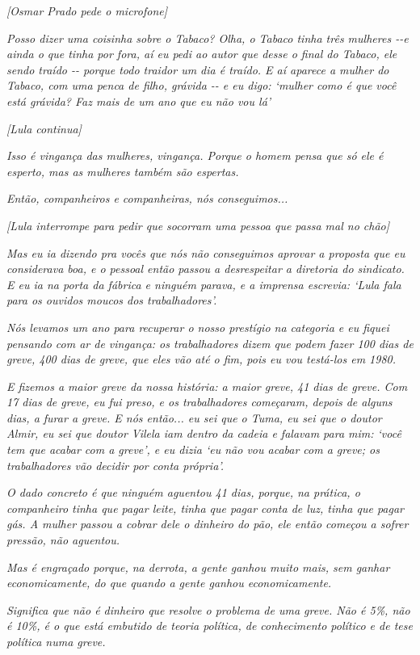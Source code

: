 \emph{{[}Osmar Prado pede o microfone{]}}

\emph{Posso dizer uma coisinha sobre o Tabaco? Olha, o Tabaco tinha três
mulheres -\/-e ainda o que tinha por fora, aí eu pedi ao autor que desse
o final do Tabaco, ele sendo traído -\/- porque todo traidor um dia é
traído. E aí aparece a mulher do Tabaco, com uma penca de filho, grávida
-\/- e eu digo: `mulher como é que você está grávida? Faz mais de um ano
que eu não vou lá'}

\emph{{[}Lula continua{]}}

\emph{Isso é vingança das mulheres, vingança. Porque o homem pensa que
só ele é esperto, mas as mulheres também são espertas.}

\emph{Então, companheiros e companheiras, nós conseguimos...}

\emph{{[}Lula interrompe para pedir que socorram uma pessoa que passa
mal no chão{]}}

\emph{Mas eu ia dizendo pra vocês que nós não conseguimos aprovar a
proposta que eu considerava boa, e o pessoal então passou a desrespeitar
a diretoria do sindicato. E eu ia na porta da fábrica e ninguém parava,
e a imprensa escrevia: `Lula fala para os ouvidos moucos dos
trabalhadores'.}

\emph{Nós levamos um ano para recuperar o nosso prestígio na categoria e
eu fiquei pensando com ar de vingança: os trabalhadores dizem que podem
fazer 100 dias de greve, 400 dias de greve, que eles vão até o fim, pois
eu vou testá-los em 1980.}

\emph{E fizemos a maior greve da nossa história: a maior greve, 41 dias
de greve. Com 17 dias de greve, eu fui preso, e os trabalhadores
começaram, depois de alguns dias, a furar a greve. E nós então... eu sei
que o Tuma, eu sei que o doutor Almir, eu sei que doutor Vilela iam
dentro da cadeia e falavam para mim: `você tem que acabar com a greve',
e eu dizia `eu não vou acabar com a greve; os trabalhadores vão decidir
por conta própria'.}

\emph{O dado concreto é que ninguém aguentou 41 dias, porque, na
prática, o companheiro tinha que pagar leite, tinha que pagar conta de
luz, tinha que pagar gás. A mulher passou a cobrar dele o dinheiro do
pão, ele então começou a sofrer pressão, não aguentou.~}

\emph{Mas é engraçado porque, na derrota, a gente ganhou muito mais, sem
ganhar economicamente, do que quando a gente ganhou economicamente.}

\emph{Significa que não é dinheiro que resolve o problema de uma greve.
Não é 5\%, não é 10\%, é o que está embutido de teoria política, de
conhecimento político e de tese política numa greve.}

